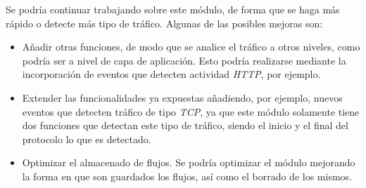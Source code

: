 Se podría continuar trabajando sobre este módulo, de forma que se haga más rápido o detecte más tipo de tráfico. Algunas de las posibles mejoras son:

\begin{itemize}
\item Añadir otras funciones, de modo que se analice el tráfico a otros niveles, como podría ser a nivel de capa de aplicación. Esto podría realizarse mediante la incorporación de eventos que detecten actividad \textit{HTTP}, por ejemplo.
\item Extender las funcionalidades ya expuestas añadiendo, por ejemplo, nuevos eventos que detecten tráfico de tipo \textit{TCP}, ya 
que este módulo solamente tiene dos funciones que detectan este tipo de tráfico, siendo el inicio y el final del protocolo lo que es 
detectado.
\item Optimizar el almacenado de flujos. Se podría optimizar el módulo mejorando la forma en que son guardados los flujos, así 
como el borrado de los mismos.
\end{itemize}